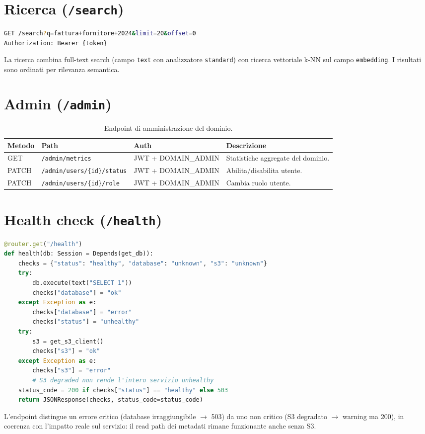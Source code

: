 \section{Ricerca (\texttt{/search})}
\label{sec:api_search}

\begin{lstlisting}[language=bash, caption={Esempio di query di ricerca.}]
GET /search?q=fattura+fornitore+2024&limit=20&offset=0
Authorization: Bearer {token}
\end{lstlisting}

La ricerca combina full-text search (campo \texttt{text} con analizzatore
\texttt{standard}) con ricerca vettoriale k-NN sul campo \texttt{embedding}.
I risultati sono ordinati per rilevanza semantica.

\section{Admin (\texttt{/admin})}
\label{sec:api_admin}

\begin{table}[ht]
\centering
\small
\begin{tabularx}{\linewidth}{l l l X}
\toprule
\textbf{Metodo} & \textbf{Path} & \textbf{Auth} & \textbf{Descrizione} \\
\midrule
GET   & \texttt{/admin/metrics}              & JWT + DOMAIN\_ADMIN & Statistiche aggregate del dominio. \\
PATCH & \texttt{/admin/users/\{id\}/status}  & JWT + DOMAIN\_ADMIN & Abilita/disabilita utente. \\
PATCH & \texttt{/admin/users/\{id\}/role}    & JWT + DOMAIN\_ADMIN & Cambia ruolo utente. \\
\bottomrule
\end{tabularx}
\caption{Endpoint di amministrazione del dominio.}
\end{table}

\section{Health check (\texttt{/health})}
\label{sec:api_health}

\begin{lstlisting}[language=Python, caption={Implementazione dell'endpoint \texttt{/health}.}]
@router.get("/health")
def health(db: Session = Depends(get_db)):
    checks = {"status": "healthy", "database": "unknown", "s3": "unknown"}
    try:
        db.execute(text("SELECT 1"))
        checks["database"] = "ok"
    except Exception as e:
        checks["database"] = "error"
        checks["status"] = "unhealthy"
    try:
        s3 = get_s3_client()
        checks["s3"] = "ok"
    except Exception as e:
        checks["s3"] = "error"
        # S3 degraded non rende l'intero servizio unhealthy
    status_code = 200 if checks["status"] == "healthy" else 503
    return JSONResponse(checks, status_code=status_code)
\end{lstlisting}

L'endpoint distingue un errore critico (database irraggiungibile $\rightarrow$ 503) da
uno non critico (S3 degradato $\rightarrow$ warning ma 200), in coerenza con l'impatto
reale sul servizio: il read path dei metadati rimane funzionante anche senza S3.
